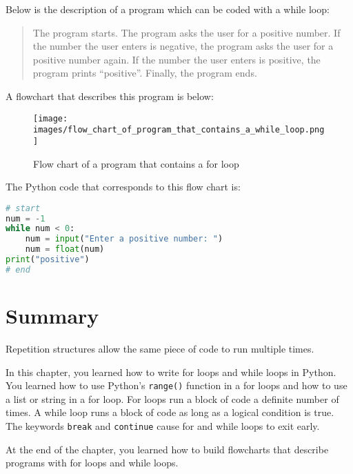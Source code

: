 \documentclass{book}
\makeatletter
\def\maxwidth{\ifdim\Gin@nat@width>\linewidth\linewidth
\else\Gin@nat@width\fi}
\let\Oldincludegraphics\includegraphics
\renewcommand{\includegraphics}[1]{\Oldincludegraphics[width=.8\maxwidth]{#1}}
\newcommand{\passthrough}[1]{#1}
\makeatother
\begin{document}
    
        Below is the description of a program which can be coded with a while
loop:

\begin{quote}
The program starts. The program asks the user for a positive number. If
the number the user enters is negative, the program asks the user for a
positive number again. If the number the user enters is positive, the
program prints ``positive''. Finally, the program ends.
\end{quote}

A flowchart that describes this program is below:

\begin{figure}
\centering
\texttt{[image: images/flow\_chart\_of\_program\_that\_contains\_a\_while\_loop.png]}
\caption{Flow chart of a program that contains a for loop}
\end{figure}

The Python code that corresponds to this flow chart is:

\begin{lstlisting}[language=Python]
# start
num = -1
while num < 0:
    num = input("Enter a positive number: ")
    num = float(num)
print("positive")
# end
\end{lstlisting}
    




    
        \newpage
        \hypertarget{summary}{%
\section{Summary}\label{summary}}

    




    
        Repetition structures allow the same piece of code to run multiple
times.

In this chapter, you learned how to write for loops and while loops in
Python. You learned how to use Python's
\passthrough{\lstinline!range()!} function in a for loops and how to use
a list or string in a for loop. For loops run a block of code a definite
number of times. A while loop runs a block of code as long as a logical
condition is true. The keywords \passthrough{\lstinline!break!} and
\passthrough{\lstinline!continue!} cause for and while loops to exit
early.

At the end of the chapter, you learned how to build flowcharts that
describe programs with for loops and while loops.
    
\end{document}
